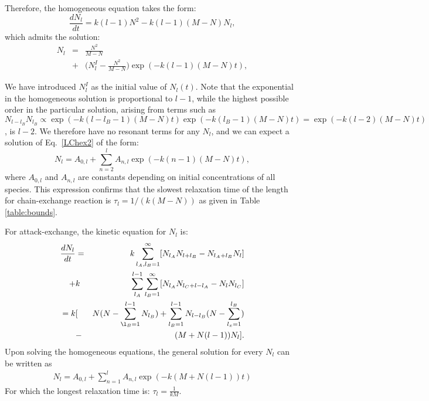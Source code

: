 \documentclass[
	amsmath,
	amssymb,
	a4paper,
	aip,		%
	jcp,		%
	reprint, twocolumn  %
	fleqn,
	showpacs,
	floatfix
]{revtex4-1}
\newcommand{\be}{\begin{equation}}
\newcommand{\ee}{\end{equation}}
\newcommand{\bea}{\begin{eqnarray}}
\newcommand{\eea}{\end{eqnarray}}
\begin{document}
Therefore, the homogeneous equation takes the form:
\be
\frac{d N_{l}}{dt}= k(l-1) N^{2} -k (l-1) (M-N) N_{l},
\label{LChex4}
\ee
which admits the solution:
\bea
N_{l} &=& \frac{N^{2}}{M-N} \label{LChex5}  \\
&+& \Big( N^{I}_{l} -\frac{N^{2}}{M-N} \Big) \exp(-k (l-1) (M-N) t), \nonumber 
\eea

We have introduced $N^{I}_{l}$ as the initial value of $N_{l}(t)$.
Note that the exponential in the homogeneous solution is proportional to $l-1$, while the highest possible order in the particular solution, 
arising from terms such as $N_{l-l_{B}} N_{l_{B}} \propto 
\exp(-k (l-l_{B}-1) (M-N) t) \exp(-k (l_{B}-1) (M-N) t) = \exp(-k (l-2) (M-N) t)$, is $l-2$. We therefore have no resonant terms 
for any $N_{l}$, and we can expect a solution of Eq.~\eqref{LChex2} of the form:
\begin{equation}
N_{l}= A_{0,l} + \sum_{n=2}^{l} A_{n,l} \exp(-k (n-1)(M-N) t),
\label{LChex2sol} 
\end{equation}
where $A_{0,l}$ and $A_{n,l}$ are constants depending on initial concentrations of all species. 
This expression confirms that the slowest relaxation time of the length for chain-exchange reaction is
$\tau_{l}=1/(k(M-N))$ as given in Table \ref{table:bounds}. 


For attack-exchange, the kinetic equation for $N_{l}$ is:
\bea
\frac{d N_{l}}{dt} &=& k \sum_{l_{A}, l_{B}=1}^{\infty}  [N_{l_{A}} N_{l+ l_{B}}  - N_{l_{A}+l_{B}} N_{l}  ]  \nonumber \\  
+ &k& \sum^{l-1}_{l_{A}} \sum_{l_{B}=1}^{\infty}  [N_{l_{A}} N_{l_{C}+l - l_{A}}  - N_{l} N_{l_{C}}  ] \label{LAttex2} \nonumber \\ 
= k &[&N (N - \sum_{\l_{B}=1}^{l-1} N_{l_{B}} ) + \sum_{l_{B}=1}^{l-1}N_{l-l_{B}}(N-\sum_{l_{x}=1}^{l_{B}}) \nonumber \\
&-& (M+N (l-1)) N_{l}].  
\eea
Upon solving the homogeneous equations, the general solution for every $N_{l}$ can be written as
\begin{equation}
	\begin{split}
N_{l}= A_{0,l} + \sum_{n=1}^{l} A_{n,l}  \exp(-k (M + N (l-1))  t)
\label{LChex2sol2}
\end{split} 
\end{equation}
For which the longest relaxation time is: $\tau_{l}=\frac{1}{k M}$.



\end{document}
